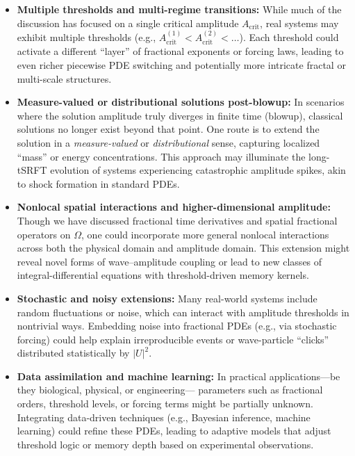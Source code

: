 \documentclass[12pt]{article}
\begin{document}
\begin{itemize}
    \item \textbf{Multiple thresholds and multi-regime transitions:}
    While much of the discussion has focused on a single critical amplitude
    $A_{\mathrm{crit}}$, real systems may exhibit multiple thresholds
    (e.g., $A_{\mathrm{crit}}^{(1)} < A_{\mathrm{crit}}^{(2)} < \dots$). 
    Each threshold could activate a different “layer” of fractional exponents
    or forcing laws, leading to even richer piecewise PDE switching and
    potentially more intricate fractal or multi-scale structures.

    \item \textbf{Measure-valued or distributional solutions post-blowup:}
    In scenarios where the solution amplitude truly diverges in finite time
    (blowup), classical solutions no longer exist beyond that point. One route
    is to extend the solution in a \emph{measure-valued} or \emph{distributional}
    sense, capturing localized “mass” or energy concentrations. This approach
    may illuminate the long-tSRFT evolution of systems experiencing catastrophic
    amplitude spikes, akin to shock formation in standard PDEs.

    \item \textbf{Nonlocal spatial interactions and higher-dimensional amplitude:}
    Though we have discussed fractional time derivatives and spatial fractional
    operators on $\Omega$, one could incorporate more general nonlocal interactions
    across both the physical domain and amplitude domain. This extension might
    reveal novel forms of wave–amplitude coupling or lead to new classes of
    integral-differential equations with threshold-driven memory kernels.

    \item \textbf{Stochastic and noisy extensions:}
    Many real-world systems include random fluctuations or noise, which can 
    interact with amplitude thresholds in nontrivial ways. Embedding noise 
    into fractional PDEs (e.g., via stochastic forcing) could help explain 
    irreproducible events or wave-particle “clicks” distributed statistically 
    by $|U|^2$. 

    \item \textbf{Data assimilation and machine learning:}
    In practical applications—be they biological, physical, or engineering—%
    parameters such as fractional orders, threshold levels, or forcing terms 
    might be partially unknown. Integrating data-driven techniques (e.g., 
    Bayesian inference, machine learning) could refine these PDEs, leading 
    to adaptive models that adjust threshold logic or memory depth based on 
    experimental observations.

\end{itemize}
\end{document}
